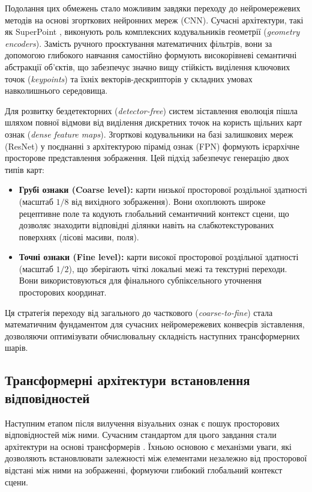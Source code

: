 \documentclass[a4paper, 12pt, titlepage]{article}
\begin{document}
Подолання цих обмежень стало можливим завдяки переходу до нейромережевих методів на основі згорткових нейронних мереж (CNN). Сучасні архітектури, такі як SuperPoint \cite{superpoint}, виконують роль комплексних кодувальників геометрії (\textit{geometry encoders}). Замість ручного проєктування математичних фільтрів, вони за допомогою глибокого навчання самостійно формують високорівневі семантичні абстракції об'єктів, що забезпечує значно вищу стійкість виділення ключових точок (\textit{keypoints}) та їхніх векторів-дескрипторів у складних умовах навколишнього середовища.

Для розвитку бездетекторних (\textit{detector-free}) систем зіставлення еволюція пішла шляхом повної відмови від виділення дискретних точок на користь щільних карт ознак (\textit{dense feature maps}). Згорткові кодувальники на базі залишкових мереж (ResNet) \cite{resnet} у поєднанні з архітектурою пірамід ознак (FPN) \cite{cnn_fpn} формують ієрархічне просторове представлення зображення. Цей підхід забезпечує генерацію двох типів карт:
\begin{itemize}
    \item \textbf{Грубі ознаки (Coarse level):} карти низької просторової роздільної здатності (масштаб $1/8$ від вихідного зображення). Вони охоплюють широке рецептивне поле та кодують глобальний семантичний контекст сцени, що дозволяє знаходити відповідні ділянки навіть на слабкотекстурованих поверхнях (лісові масиви, поля).
    \item \textbf{Точні ознаки (Fine level):} карти високої просторової роздільної здатності (масштаб $1/2$), що зберігають чіткі локальні межі та текстурні переходи. Вони використовуються для фінального субпіксельного уточнення просторових координат.
\end{itemize}

Ця стратегія переходу від загального до часткового (\textit{coarse-to-fine}) стала математичним фундаментом для сучасних нейромережевих конвеєрів зіставлення, дозволяючи оптимізувати обчислювальну складність наступних трансформерних шарів.

\subsection{Трансформерні архітектури встановлення відповідностей}

Наступним етапом після вилучення візуальних ознак є пошук просторових відповідностей між ними. Сучасним стандартом для цього завдання стали архітектури на основі трансформерів \cite{attention_all_need}. Їхньою основою є механізми уваги, які дозволяють встановлювати залежності між елементами незалежно від просторової відстані між ними на зображенні, формуючи глибокий глобальний контекст сцени.
\end{document}

